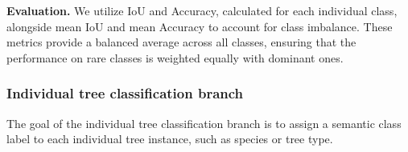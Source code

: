 \documentclass[review,authoryear]{elsarticle}
\begin{document}


\textbf{Evaluation.} We utilize IoU and Accuracy, calculated for each individual class, alongside mean IoU and mean Accuracy to account for class imbalance. These metrics provide a balanced average across all classes, ensuring that the performance on rare classes is weighted equally with dominant ones.


\subsubsection{Individual tree classification branch}

The goal of the individual tree classification branch is to assign a semantic class label to each individual tree instance, such as species or tree type. 



\end{document}
